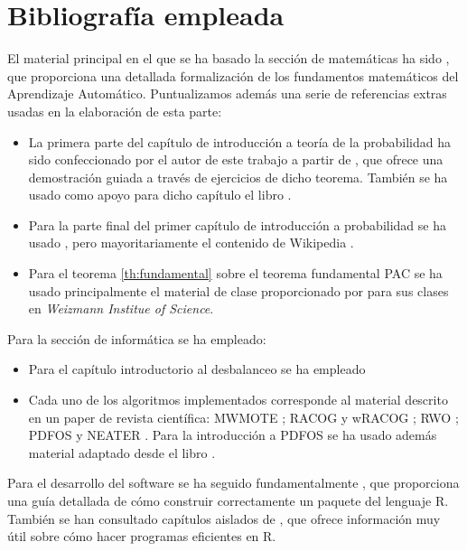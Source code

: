 \section{Bibliografía empleada}
El material principal en el que se ha basado la sección de matemáticas ha sido \citep{shalev}, 
que proporciona una detallada formalización de los fundamentos matemáticos del Aprendizaje Automático. Puntualizamos además
una serie de referencias extras usadas en la elaboración de esta parte:

\begin{itemize} 
 \item La primera parte del capítulo de introducción a teoría de la probabilidad ha sido confeccionado por el autor de 
 este trabajo a partir de \citep{caratheodory}, que ofrece una demostración guiada a través de ejercicios de dicho teorema. 
 También se ha usado como apoyo para dicho capítulo el libro \citep{loeve}. 
 \item Para la parte final del primer capítulo de introducción a probabilidad se ha usado \citep{shalev}, pero
 mayoritariamente el contenido de Wikipedia \citep{wiki:markov, wiki:hoeff_lemma, wiki:hoeffding}.
 \item Para el teorema \ref{th:fundamental} sobre el teorema fundamental PAC se ha usado principalmente el material de clase
 proporcionado por \citep{slfetaya} para sus clases en \textit{Weizmann Institue of Science}.
\end{itemize}
 
 Para la sección de informática se ha empleado:
 
\begin{itemize}
 \item Para el capítulo introductorio al desbalanceo se ha empleado \citep{he2009} 
 \item Cada uno de los algoritmos implementados corresponde al material descrito en un paper de revista científica: 
 MWMOTE \citep{barua14}; RACOG y wRACOG \citep{das2015}; RWO \citep{zhang2014}; PDFOS \citep{gao2014} y 
 NEATER \citep{almogahed2014}. Para la introducción a PDFOS se ha usado además material adaptado desde el libro \citep{silverman}.
\end{itemize}

 Para el desarrollo del software se ha seguido fundamentalmente \citep{rhadleypkg}, que proporciona una guía detallada de
 cómo construir correctamente un paquete del lenguaje R. También se han consultado capítulos aislados de \citep{rgillespie},
 que ofrece información muy útil sobre cómo hacer programas eficientes en R.
 
